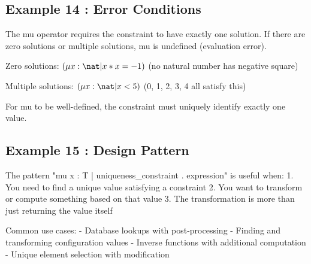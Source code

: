 \documentclass[a4paper,10pt,fleqn]{article}
\begin{document}
\bigskip

\subsection*{Example 14 : Error Conditions}

\noindent The mu operator requires the constraint to have exactly one solution. If there are zero solutions or multiple solutions, mu is undefined (evaluation error).

\bigskip

\noindent Zero solutions: $(\mu x : \nat | x * x = -1)$ (no natural number has negative square)

\bigskip

\noindent Multiple solutions: $(\mu x : \nat | x < 5)$ (0, 1, 2, 3, 4 all satisfy this)

\bigskip

\noindent For mu to be well-defined, the constraint must uniquely identify exactly one value.

\bigskip

\subsection*{Example 15 : Design Pattern}

\noindent The pattern "mu x : T | uniqueness\_constraint . expression" is useful when: 1. You need to find a unique value satisfying a constraint 2. You want to transform or compute something based on that value 3. The transformation is more than just returning the value itself

\bigskip

\noindent Common use cases: - Database lookups with post-processing - Finding and transforming configuration values - Inverse functions with additional computation - Unique element selection with modification

\bigskip
\end{document}
